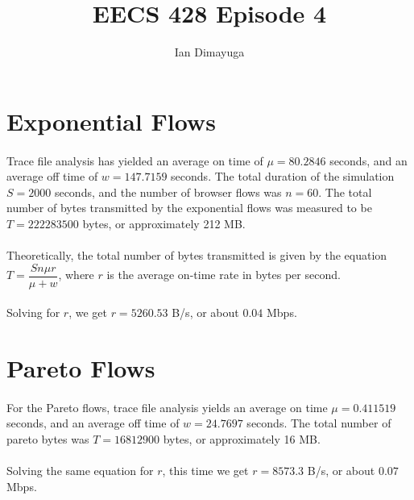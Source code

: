 \documentclass{article}
\begin{document}
\title{EECS 428 Episode 4}
\author{Ian Dimayuga}
\maketitle

\section{Exponential Flows}

\paragraph{}
Trace file analysis has yielded an average on time of $\mu = 80.2846$ seconds, and an average off time of $w = 147.7159$ seconds.
The total duration of the simulation $S = 2000$ seconds, and the number of browser flows was $n = 60$.
The total number of bytes transmitted by the exponential flows was measured to be $T = 222283500$ bytes, or approximately 212 MB.

\paragraph{}
Theoretically, the total number of bytes transmitted is given by the equation $T = \dfrac{S n \mu r}{\mu + w}$, where $r$ is the average on-time rate in bytes per second.

\paragraph{}
Solving for $r$, we get $r = 5260.53$ B/s, or about $0.04$ Mbps.

\section{Pareto Flows}
\paragraph{}
For the Pareto flows, trace file analysis yields an average on time $\mu = 0.411519$ seconds, and an average off time of $w = 24.7697$ seconds.
The total number of pareto bytes was $T = 16812900$ bytes, or approximately 16 MB.

\paragraph{}
Solving the same equation for $r$, this time we get $r = 8573.3$ B/s, or about $0.07$ Mbps.
\end{document}
